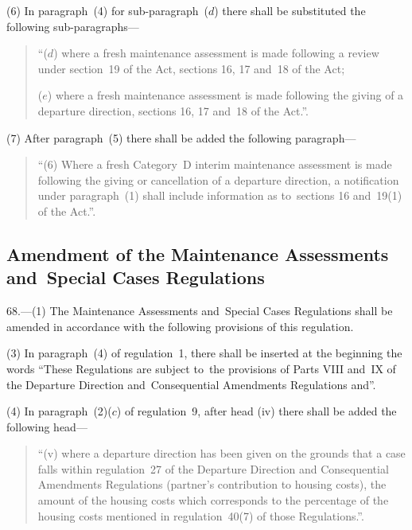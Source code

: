 \documentclass[12pt,a4paper]{article}
\begin{document}
(6) In paragraph~(4) for sub-paragraph~($d$) there shall be substituted the
following sub-paragraphs—
\begin{quotation}
“($d$) where a fresh maintenance assessment is made following a review under
section~19 of the Act, sections 16, 17 and~18 of the Act;

($e$) where a fresh maintenance assessment is made following the giving of a
departure direction, sections 16, 17 and~18 of the Act.”.
\end{quotation}

(7) After paragraph~(5) there shall be added the following paragraph—
\begin{quotation}
“(6) Where a fresh Category~D interim maintenance assessment is made following
the giving or cancellation of a departure direction, a notification under
paragraph~(1) shall include information as to~sections 16 and~19(1) of the
Act.”.
\end{quotation}

\subsection[68. Amendment of the Maintenance Assessments and~Special Cases Regulations]{\sloppy Amendment of the Maintenance Assessments and~Special Cases Regulations}

68.—(1)
The Maintenance Assessments and~Special Cases Regulations shall be amended in
accordance with the following provisions of this regulation.



(3) In paragraph~(4) of regulation~1, there shall be inserted at the beginning
the words “These Regulations are subject to~the provisions of Parts VIII and~IX
of the Departure Direction and~Consequential Amendments Regulations and”.

(4) In paragraph~(2)($c$) of regulation~9, after head (iv) there shall be added
the following head—
\begin{quotation}
“(v) where a departure direction has been given on the grounds that a case falls
within regulation~27 of the Departure Direction and Consequential Amendments
Regulations (partner’s contribution to housing costs), the amount of the housing
costs which corresponds to the percentage of the housing costs mentioned in
regulation~40(7) of those Regulations.”.
\end{quotation}
\end{document}
